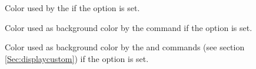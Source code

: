 \begin{slide}
\begin{description}
    \newslide

  \item[\present{color: \code{inactivecolor}}]
    Color used by the  if the
     option is set.

  \item[\present{color: \code{presentcolor}}]
    Color used as background color by the 
    command if the  option is set.

  \item[\present{color: \code{highlightcolor}}]
    Color used as background color by the
     and  commands (see section
    \ref{Sec:displaycustom}) if the  option is set.
  \end{description}

{%
  \newslide

  \whitebackground


  \newlength{\widthfirstcol}

}
\end{slide}
